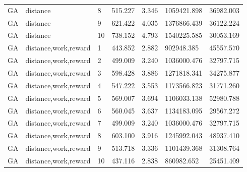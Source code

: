\documentclass{tamuccthesis}
\begin{document}
\begin{appendices}
\begin{small}
\begin{longtable}{lllllll}
GA & distance    & 8   & 515.227 & 3.346 & 1059421.898 & 36982.003 \\
GA & distance    & 9   & 621.422 & 4.035 & 1376866.439 & 36122.224 \\
GA & distance    & 10  & 738.152 & 4.793 & 1540225.585 & 30053.169  \\
GA & distance,work,reward    & 1   & 443.852 & 2.882 &  902948.385 & 45557.570 \\
GA & distance,work,reward    & 2   & 499.009 & 3.240 & 1036000.476 & 32797.715 \\
GA & distance,work,reward    & 3   & 598.428 & 3.886 & 1271818.341 & 34275.877 \\
GA & distance,work,reward    & 4   & 547.222 & 3.553 & 1173566.823 & 31771.260 \\
GA & distance,work,reward    & 5   & 569.007 & 3.694 & 1106033.138 & 52980.788 \\
GA & distance,work,reward    & 6   & 560.045 & 3.637 & 1134183.095 & 29567.272 \\
GA & distance,work,reward    & 7   & 499.009 & 3.240 & 1036000.476 & 32797.715 \\
GA & distance,work,reward    & 8   & 603.100 & 3.916 & 1245992.043 & 48937.410 \\
GA & distance,work,reward    & 9   & 513.718 & 3.336 & 1101439.368 & 31308.764 \\
GA & distance,work,reward    & 10  & 437.116 & 2.838 &  860982.652 & 25451.409
\end{longtable}
\end{small}


\end{appendices}
\end{document}
